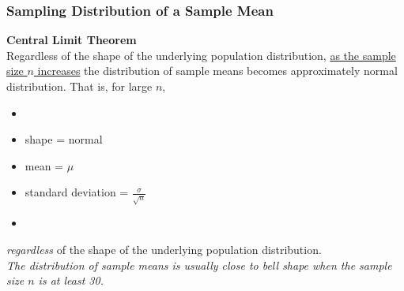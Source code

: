 \begin{frame}
\frametitle{Sampling Distribution of a Sample Mean}
\textbf{Central Limit Theorem}\\
\vskip10pt
Regardless of the shape of the underlying population distribution, \underline{as the sample size $n$ increases} the distribution of sample means becomes approximately normal distribution.
\vskip10pt
That is, for large $n$,
\begin{itemize}
\item[]
\item shape = normal
\item mean = $\mu$
\item standard deviation = $\displaystyle\frac{\sigma}{\sqrt{n}}$
\item[]
\end{itemize}
\emph{regardless} of the shape of the underlying population distribution.\\
\vskip10pt
\emph{The distribution of sample means is usually close to bell shape when the sample size $n$ is at least 30.}
\end{frame}


